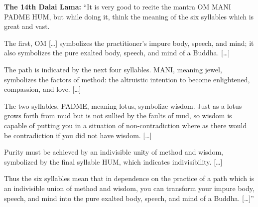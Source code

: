   \begin{explanation}[EN]
    \textbf{The 14th Dalai Lama:} ``It is very good to recite the mantra OM
    MANI PADME HUM, but while doing it, think the meaning of the six syllables
    which is great and vast.
    \par
    The first, OM [\ldots] symbolizes the practitioner's impure body, speech,
    and mind; it also symbolizes the pure exalted body, speech, and mind of a
    Buddha. [\ldots]
    \par
    The path is indicated by the next four syllables. MANI, meaning jewel,
    symbolizes the factors of method: the altruistic intention to become
    enlightened, compassion, and love. [\ldots]
    \par
    The two syllables, PADME, meaning lotus, symbolize wisdom. Just as a lotus
    grows forth from mud but is not sullied by the faults of mud, so wisdom is
    capable of putting you in a situation of non-contradiction where as there
    would be contradiction if you did not have wisdom. [\ldots]
    \par
    Purity must be achieved by an indivisible unity of method and wisdom,
    symbolized by the final syllable HUM, which indicates indivisibility. [\ldots]
    \par
    Thus the six syllables mean that in dependence on the practice of a path
    which is an indivisible union of method and wisdom, you can transform your
    impure body, speech, and mind into the pure exalted body, speech, and mind
    of a Buddha. [\ldots]''
  \end{explanation}
\endsong


